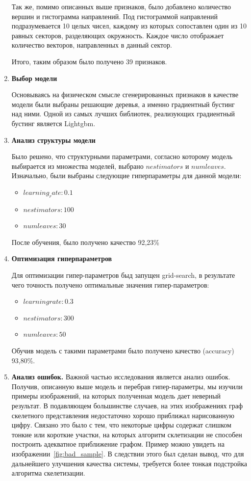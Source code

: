 \documentclass[12pt, twoside]{article}
\begin{document}
\begin{enumerate}
 Так же, помимо описанных выше признаков, было добавлено количество вершин и гистограмма направлений. Под гистограммой направлений подразумевается 10 целых чисел, каждому из которых сопоставлен один из 10 равных секторов, разделяющих окружность. Каждое число отображает количество векторов, направленных в данный сектор.
 
Итого, таким образом было получено 39 признаков. 

 \item  \textbf{Выбор модели}
 
Основываясь на физическом смысле сгенерированных признаков в качестве модели были выбраны решающие деревья, а именно градиентный бустинг над ними. Одной из самых лучших библиотек, реализующих градиентный бустинг является Lightgbm. 
 
 \item  \textbf{Анализ структуры модели} 
 
Было решено, что структурными параметрами, согласно которому модель выбирается из множества моделей, выбрано $n estimators$ и  $num leaves$.
Изначально, были выбраны следующие гиперпараметры для данной модели: 

\begin{itemize}
	\item $learning_rate: 0.1$
	\item $n estimators: 100$
	\item $num leaves: 30$
\end{itemize}
 
После обучения, было получено качество 92,23\%
 
 \item  \textbf{Оптимизация гиперпараметров}
 
 Для оптимизации гипер-параметров быд запущен grid-search, в результате чего точность получено оптимальные значения гипер-параметров:
 
 \begin{itemize}
	\item $learning rate: 0.3$
	\item $n estimators: 300$
	\item $num leaves: 50$
\end{itemize}

Обучив модель с такими параметрами было получено качество (accuracy) 93,80\%. 
 
 
 \item  \textbf{Анализ ошибок.}
 Важной частью исследования является анализ ошибок. Получив, описанную выше модель и перебрав гипер-параметры, мы изучили примеры изображений, на которых полученная модель дает неверный результат. В подавляющем большинстве случаев, на этих изображениях граф скелетного представления недостаточно хорошо приближал нарисованную цифру. Связано это было с тем, что некоторые цифры содержат слишком тонкие или короткие участки, на которых алгоритм склетизации не способен построить адекватное приближение графом. Пример можно увидеть на изображении~\ref{fig:bad_sample}. В следствии этого был сделан вывод, что для дальнейшего улучшения качества системы, требуется более тонкая подстройка алгоритма скелетизации.
 

\end{enumerate}
\end{document}
